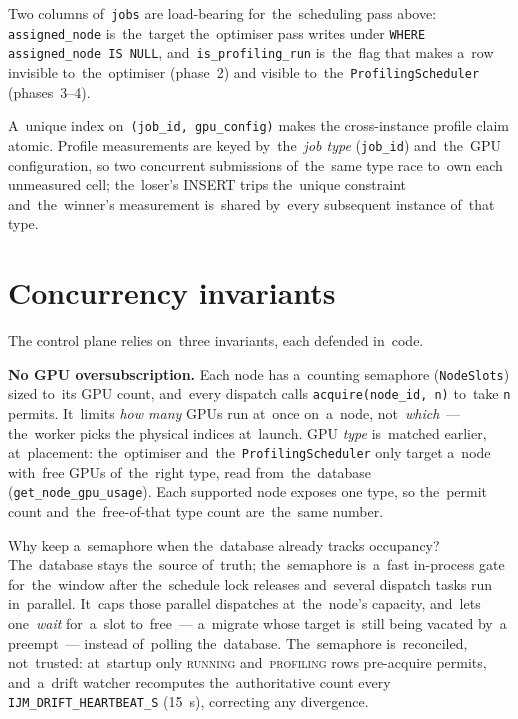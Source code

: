 Two columns of~\texttt{jobs} are load-bearing for~the~scheduling pass
above: \texttt{assigned\_node} is~the~target the~optimiser pass writes
under \texttt{WHERE assigned\_node IS NULL}, and~\texttt{is\_profiling\_run}
is~the~flag that makes a~row invisible to~the~optimiser (phase~2) and
visible to~the~\texttt{ProfilingScheduler} (phases~3--4).

A~unique index on~\texttt{(job\_id, gpu\_config)} makes the
cross-instance profile claim atomic.  Profile measurements are keyed
by~the~\emph{job type} (\texttt{job\_id}) and~the~GPU configuration, so
two concurrent submissions of~the~same type race to~own each unmeasured
cell; the~loser's INSERT trips the~unique constraint and~the~winner's
measurement is~shared by~every subsequent instance of~that type.

\section{Concurrency invariants}

The control plane relies on~three invariants, each defended in~code.

\textbf{No GPU oversubscription.}  Each node has a~counting semaphore
(\texttt{NodeSlots}) sized to~its GPU count, and~every dispatch calls
\texttt{acquire(node\_id,\,n)} to~take \texttt{n} permits.  It~limits \emph{how
many} GPUs run at~once on~a~node, not~\emph{which}~--- the~worker picks the
physical indices at~launch.  GPU \emph{type} is~matched earlier, at~placement:
the~optimiser and~the~\texttt{ProfilingScheduler} only target a~node with~free
GPUs of~the~right type, read from~the~database (\texttt{get\_node\_gpu\_usage}).
Each supported node exposes one type, so the~permit count and~the~free-of-that
type count are~the~same number.

Why keep a~semaphore when the~database already tracks occupancy?  The~database
stays the~source of~truth; the~semaphore is~a~fast in-process gate for~the~window
after the~schedule lock releases and~several dispatch tasks run in~parallel.
It~caps those parallel dispatches at~the~node's capacity, and~lets one~\emph{wait}
for~a~slot to~free~--- a~migrate whose target is~still being vacated by~a
preempt~--- instead of~polling the~database.  The~semaphore is~reconciled,
not~trusted: at~startup only \textsc{running} and~\textsc{profiling} rows
pre-acquire permits, and~a~drift watcher recomputes the~authoritative count
every \texttt{IJM\_DRIFT\_HEARTBEAT\_S} (15~s), correcting any divergence.

